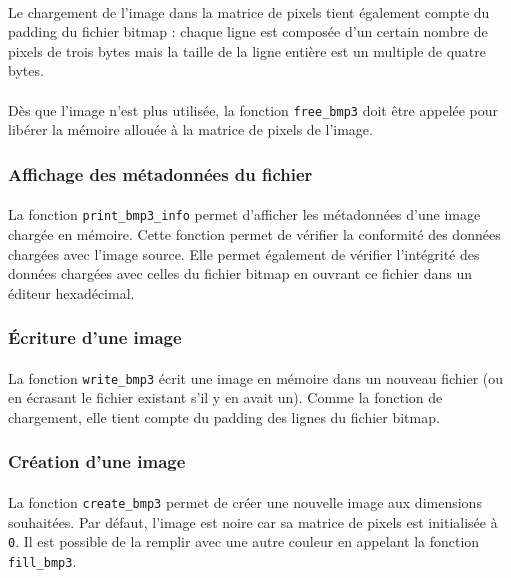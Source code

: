 \documentclass{article}
\begin{document}
    \paragraph{}
    Le chargement de l'image dans la matrice de pixels tient également compte du padding du fichier bitmap : chaque ligne est composée d'un certain nombre de pixels de trois bytes mais la taille de la ligne entière est un multiple de quatre bytes.
    
    \paragraph{}
    Dès que l'image n'est plus utilisée, la fonction \texttt{free\_bmp3} doit être appelée pour libérer la mémoire allouée à la matrice de pixels de l'image.

    \subsubsection{Affichage des métadonnées du fichier}
    \paragraph{}
    La fonction \texttt{print\_bmp3\_info} permet d'afficher les métadonnées d'une image chargée en mémoire. Cette fonction permet de vérifier la conformité des données chargées avec l'image source. Elle permet également de vérifier l'intégrité des données chargées avec celles du fichier bitmap en ouvrant ce fichier dans un éditeur hexadécimal.

    \subsubsection{Écriture d'une image}
    \paragraph{}
    La fonction \texttt{write\_bmp3} écrit une image en mémoire dans un nouveau fichier (ou en écrasant le fichier existant s'il y en avait un). Comme la fonction de chargement, elle tient compte du padding des lignes du fichier bitmap.

    \subsubsection{Création d'une image}
    \paragraph{}
    La fonction \texttt{create\_bmp3} permet de créer une nouvelle image aux dimensions souhaitées. Par défaut, l'image est noire car sa matrice de pixels est initialisée à \texttt{0}. Il est possible de la remplir avec une autre couleur en appelant la fonction \texttt{fill\_bmp3}.
\end{document}
